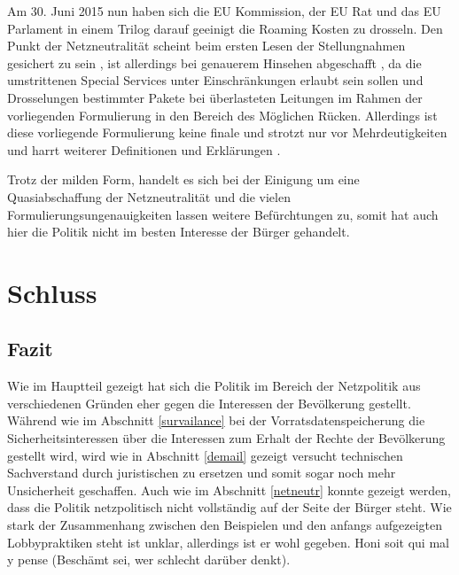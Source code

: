 \documentclass[
	12pt,
	a4paper,
	BCOR10mm,
	DIV14,
	listof=totoc,
	bibliography=totoc,
	headsepline
]{scrreprt}
\begin{document}
Am 30. Juni 2015 nun haben sich die EU Kommission, der EU Rat und das EU Parlament in einem Trilog darauf geeinigt die Roaming Kosten zu drosseln.
Den Punkt der Netzneutralität scheint beim ersten Lesen der Stellungnahmen gesichert zu sein \cite{ecwelcomennn}, ist allerdings bei genauerem Hinsehen abgeschafft \cite{nepo:endnn}, da die umstrittenen Special Services unter Einschränkungen erlaubt sein sollen und Drosselungen bestimmter Pakete bei überlasteten Leitungen im Rahmen der vorliegenden Formulierung in den Bereich des Möglichen Rücken.
Allerdings ist diese vorliegende Formulierung keine finale und strotzt nur vor Mehrdeutigkeiten und harrt weiterer Definitionen und Erklärungen \cite{nndealblurry}.

Trotz der milden Form, handelt es sich bei der Einigung um eine Quasiabschaffung der Netzneutralität und die vielen Formulierungsungenauigkeiten lassen weitere Befürchtungen zu, somit hat auch hier die Politik nicht im besten Interesse der Bürger gehandelt.



\chapter{Schluss}
\label{end}
\section{Fazit}
\label{conclusion}
Wie im Hauptteil gezeigt hat sich die Politik im Bereich der Netzpolitik aus verschiedenen Gründen eher gegen die Interessen der Bevölkerung gestellt.
Während wie im Abschnitt \ref{survailance} bei der Vorratsdatenspeicherung die Sicherheitsinteressen über die Interessen zum Erhalt der Rechte der Bevölkerung gestellt wird, wird wie in Abschnitt \ref{demail} gezeigt versucht technischen Sachverstand durch juristischen zu ersetzen und somit sogar noch mehr Unsicherheit geschaffen.
Auch wie im Abschnitt \ref{netneutr} konnte gezeigt werden, dass die Politik netzpolitisch nicht vollständig auf der Seite der Bürger steht.
Wie stark der Zusammenhang zwischen den Beispielen und den anfangs aufgezeigten Lobbypraktiken steht ist unklar, allerdings ist er wohl gegeben.
Honi soit qui mal y pense (Beschämt sei, wer schlecht darüber denkt).
\end{document}
